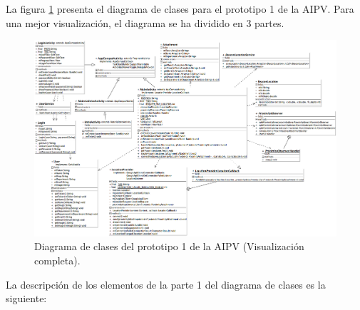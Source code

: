 La figura \ref{clases-AIPV1} presenta el diagrama de clases para el prototipo 1 de la AIPV. Para una mejor visualización, el diagrama se ha dividido en 3 partes. 

\FloatBarrier
\begin{figure}[htbp!]
		\centering
			\includegraphics[width=.9 \textwidth]{imagenes/adrian/vendedor/prototipo1/clases}
		\caption{Diagrama de clases del prototipo 1 de la AIPV (Visualización completa).}
		\label{clases-AIPV1}
\end{figure}
\FloatBarrier

La descripción de los elementos de la parte 1 del diagrama de clases es la siguiente: 


